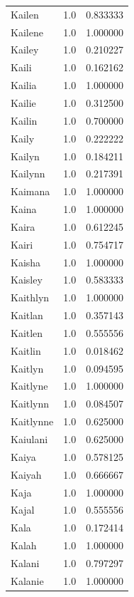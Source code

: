 \documentclass[
  letterpaper,
  DIV=11,
  numbers=noendperiod]{scrreprt}
\begin{document}
\begin{tabular}{lrr}
Kailen          &   1.0 &   0.833333 \\
Kailene         &   1.0 &   1.000000 \\
Kailey          &   1.0 &   0.210227 \\
Kaili           &   1.0 &   0.162162 \\
Kailia          &   1.0 &   1.000000 \\
Kailie          &   1.0 &   0.312500 \\
Kailin          &   1.0 &   0.700000 \\
Kaily           &   1.0 &   0.222222 \\
Kailyn          &   1.0 &   0.184211 \\
Kailynn         &   1.0 &   0.217391 \\
Kaimana         &   1.0 &   1.000000 \\
Kaina           &   1.0 &   1.000000 \\
Kaira           &   1.0 &   0.612245 \\
Kairi           &   1.0 &   0.754717 \\
Kaisha          &   1.0 &   1.000000 \\
Kaisley         &   1.0 &   0.583333 \\
Kaithlyn        &   1.0 &   1.000000 \\
Kaitlan         &   1.0 &   0.357143 \\
Kaitlen         &   1.0 &   0.555556 \\
Kaitlin         &   1.0 &   0.018462 \\
Kaitlyn         &   1.0 &   0.094595 \\
Kaitlyne        &   1.0 &   1.000000 \\
Kaitlynn        &   1.0 &   0.084507 \\
Kaitlynne       &   1.0 &   0.625000 \\
Kaiulani        &   1.0 &   0.625000 \\
Kaiya           &   1.0 &   0.578125 \\
Kaiyah          &   1.0 &   0.666667 \\
Kaja            &   1.0 &   1.000000 \\
Kajal           &   1.0 &   0.555556 \\
Kala            &   1.0 &   0.172414 \\
Kalah           &   1.0 &   1.000000 \\
Kalani          &   1.0 &   0.797297 \\
Kalanie         &   1.0 &   1.000000 \\

\end{tabular}
\end{document}
